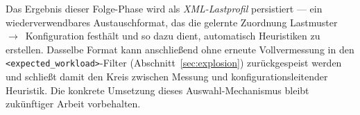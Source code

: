 Das Ergebnis dieser Folge-Phase wird als \emph{XML-Lastprofil} persistiert --- ein
wiederverwendbares Austauschformat, das die gelernte Zuordnung
Lastmuster~$\rightarrow$~Konfiguration festhält und so dazu dient, automatisch Heuristiken zu
erstellen. Dasselbe Format kann anschließend ohne erneute Vollvermessung in den
\texttt{<expected\_workload>}-Filter (Abschnitt~\ref{sec:explosion}) zurückgespeist werden und
schließt damit den Kreis zwischen Messung und konfigurationsleitender Heuristik. Die konkrete
Umsetzung dieses Auswahl-Mechanismus bleibt zukünftiger Arbeit vorbehalten.
